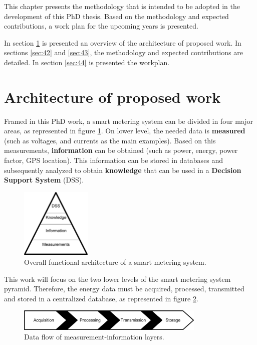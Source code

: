 
This chapter presents the methodology that is intended to be adopted in the development of this PhD thesis. Based on the methodology and expected contributions, a work plan for the upcoming years is presented.

In section \ref{sec:41} is presented an overview of the architecture of proposed work. In sections \ref{sec:42} and \ref{sec:43}, the methodology and expected contributions are detailed.
In section \ref{sec:44} is presented the workplan.

\section{Architecture of proposed work}
\label{sec:41}


Framed in this PhD work, a smart metering system can be divided in four major areas, as represented in figure \ref{fig:41topLevel}. On lower level, the needed data is \textbf{measured} (such as voltages, and currents as the main examples).
Based on this measurements, \textbf{information} can be obtained (such as power, energy, power factor, GPS location).
This information can be stored in databases and subsequently analyzed to obtain \textbf{knowledge} that can be used in a \textbf{Decision Support System} (DSS).

\begin{figure}[h!]
	\centering
	\vspace{-1em}
	\includegraphics[width=0.3\textwidth,keepaspectratio]{figures/40.Method/pyramid}
	\caption{Overall functional architecture of a smart metering system.}
	\label{fig:41topLevel}
\end{figure}

This work will focus on the two lower levels of the smart metering system pyramid. 
Therefore, the energy data must be acquired, processed, transmitted and stored in a centralized database, as represented in figure \ref{fig:41dataFlow}.

\begin{figure}[h!]
	\centering
	\includegraphics[width=0.8\textwidth,keepaspectratio]{figures/40.Method/data_flow}
	\caption{Data flow of measurement-information layers.}
	\label{fig:41dataFlow}
\end{figure}


